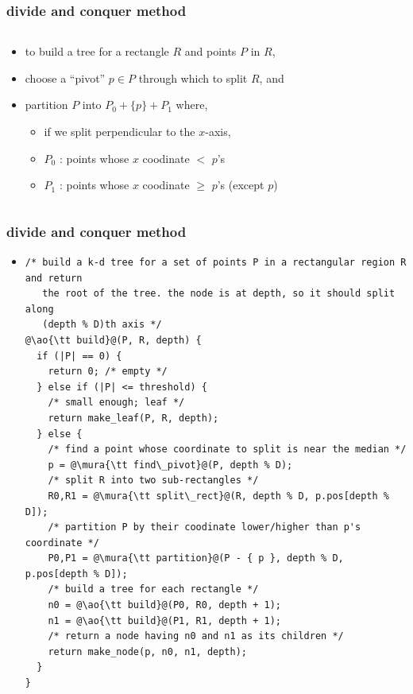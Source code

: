 \documentclass[12pt,dvipdfmx]{beamer}
\newcommand{\mura}[1]{{\color{purple}#1}}
\newcommand{\ao}[1]{{\color{blue}#1}}
\begin{document}
\begin{frame}
\frametitle{divide and conquer method}
\begin{columns}
\begin{column}{0.55\textwidth}
\begin{itemize}
\item<1-> to build a tree for a rectangle $R$ and points $P$ in $R$,
\item<2-> choose a ``pivot'' $p \in P$ through which to split $R$, and
\item<3-> partition $P$ into $P_0 + \{ p \} + P_1$ where,
  \begin{itemize}
  \item if we split perpendicular to the $x$-axis,
  \item $P_0$ : points whose $x$ coodinate $<$ $p$'s
  \item $P_1$ : points whose $x$ coodinate $\geq$ $p$'s (except $p$)
  \end{itemize}
\end{itemize}
\end{column}
  
\begin{column}{0.45\textwidth}
\begin{center}
\def\svgwidth{\columnwidth}
%
\only<2>{}%
\end{center}
\end{column}
\end{columns}
\end{frame}

\begin{frame}[fragile]
\frametitle{divide and conquer method}
\begin{itemize}
\item []
\begin{lstlisting}
/* build a k-d tree for a set of points P in a rectangular region R and return 
   the root of the tree. the node is at depth, so it should split along 
   (depth % D)th axis */
@\ao{\tt build}@(P, R, depth) {
  if (|P| == 0) {
    return 0; /* empty */
  } else if (|P| <= threshold) {
    /* small enough; leaf */
    return make_leaf(P, R, depth);
  } else {
    /* find a point whose coordinate to split is near the median */
    p = @\mura{\tt find\_pivot}@(P, depth % D);
    /* split R into two sub-rectangles */
    R0,R1 = @\mura{\tt split\_rect}@(R, depth % D, p.pos[depth % D]);
    /* partition P by their coodinate lower/higher than p's coordinate */
    P0,P1 = @\mura{\tt partition}@(P - { p }, depth % D, p.pos[depth % D]);
    /* build a tree for each rectangle */
    n0 = @\ao{\tt build}@(P0, R0, depth + 1);
    n1 = @\ao{\tt build}@(P1, R1, depth + 1);
    /* return a node having n0 and n1 as its children */
    return make_node(p, n0, n1, depth);
  }
}
\end{lstlisting}
\end{itemize}
\end{frame}
\end{document}
